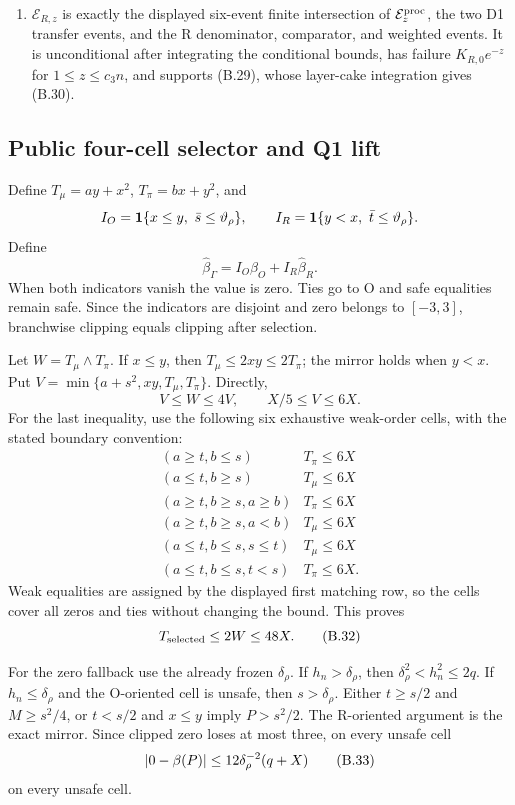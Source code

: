 \begin{enumerate}
\item \(\mathcal E_{R,z}\) is exactly the displayed six-event finite
intersection of \(\mathcal E_z^{\rm proc}\), the two D1 transfer events,
and the R denominator, comparator, and weighted events.  It is unconditional
after integrating the conditional bounds, has failure
\(K_{R,0}e^{-z}\) for \(1\le z\le c_3n\), and supports (B.29), whose
layer-cake integration gives (B.30).
\end{enumerate}

\subsection{Public four-cell selector and Q1 lift}
\label{app:upper-selector}

Define \(T_\mu=ay+x^2\), \(T_\pi=bx+y^2\), and
\[
 I_O=\mathbf 1\{x\le y,\ \bar s\le\vartheta_\rho\},\qquad
 I_R=\mathbf 1\{y<x,\ \bar t\le\vartheta_\rho\}.
\]
Define
\[
 \widehat\beta_\Gamma=I_O\widehat\beta_O+I_R\widehat\beta_R.
\]
When both indicators vanish the value is zero.  Ties go to O and safe
equalities remain safe.  Since the indicators are disjoint and zero belongs
to \([-3,3]\), branchwise clipping equals clipping after selection.

Let \(W=T_\mu\wedge T_\pi\).  If \(x\le y\), then
\(T_\mu\le2xy\le2T_\pi\); the mirror holds when \(y<x\).  Put
\(V=\min\{a+s^2,xy,T_\mu,T_\pi\}\).  Directly,
\[
 V\le W\le4V,\qquad X/5\le V\le6X.
 \tag{B.31}
\]
For the last inequality, use the following six exhaustive weak-order cells,
with the stated boundary convention:
\[
\begin{array}{c|c}
 (a\ge t,b\le s)&T_\pi\le6X\\
 (a\le t,b\ge s)&T_\mu\le6X\\
 (a\ge t,b\ge s,a\ge b)&T_\pi\le6X\\
 (a\ge t,b\ge s,a<b)&T_\mu\le6X\\
 (a\le t,b\le s,s\le t)&T_\mu\le6X\\
 (a\le t,b\le s,t<s)&T_\pi\le6X.
\end{array}
\]
Weak equalities are assigned by the displayed first matching row, so the
cells cover all zeros and ties without changing the bound.  This proves
\begin{equation}
 T_{\rm selected}\le2W\le48X.
 \tag{B.32}
\end{equation}

For the zero fallback use the already frozen \(\delta_\rho\).  If
\(h_n>\delta_\rho\), then \(\delta_\rho^2<h_n^2\le2q\).  If
\(h_n\le\delta_\rho\) and the O-oriented cell is unsafe, then
\(s>\delta_\rho\).  Either \(t\ge s/2\) and \(M\ge s^2/4\), or
\(t<s/2\) and \(x\le y\) imply \(P>s^2/2\).  The R-oriented argument is
the exact mirror.  Since clipped zero loses at most three, on every unsafe
cell
\begin{equation}
 \lvert 0-\beta(P)\rvert\le12\delta_\rho^{-2}(q+X)
 \tag{B.33}
\end{equation}
on every unsafe cell.


